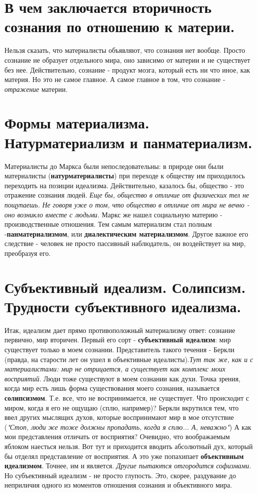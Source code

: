 \documentclass[12pt,a4paper]{article}
\begin{document}
\section{В чем заключается вторичность сознания по отношению к материи.}
Нельзя сказать, что материалисты объявляют, что сознания нет вообще. Просто сознание не образует отдельного мира, оно зависимо от материи и не существует без нее. Действительно, сознание - продукт мозга, который есть ни что иное, как материя. Но это не самое главное. А самое главное в том, что сознание - \textsl{отражение} материи.

\section{Формы материализма. Натурматериализм и панматериализм.}
Материалисты до Маркса были непоследовательны: в природе они были материалисты (\textbf{натурматериалисты}) при переходе к обществу им приходилось переходить на позиции идеализма. Действительно, казалось бы, общество - это отражение сознания людей. 
\textit{Еще бы, общество в отличие от физических тел не пощупаешь.}
\textit{Не говоря уже о том, что общество в отличие от мира не вечно - оно возникло вместе с людьми.} Маркс же нашел социальную материю - производственные отношения. Тем самым материализм стал полным -\textbf{панматериализмом}, или \textbf{диалектическим материализмом}. Другое важное его следствие - человек не просто пассивный наблюдатель, он воздействует на мир, преобразуя его.

\section{Субъективный идеализм. Солипсизм. Трудности субъективного идеализма.}
Итак, идеализм дает прямо противоположный материализму ответ: сознание первично, мир вторичен.  Первый его сорт - \textbf{субъективный идеализм}: мир существует только в моем сознании. Представитель такого течения - Беркли (правда, на старости лет он ушел в объективные идеалисты).\textit{Тут так же, как и с материалистами: мир не отрицается, а существует как комплекс моих восприятий}. Люди тоже существуют в моем сознании как духи.
Точка зрения, когда мир есть лишь форма существования моего сознания, называется \textbf{солипсизмом}. Т.е. все, что не воспринимается, не существует. Что происходит с миром, когда я его не ощущаю (сплю, например)? Беркли вкрутился тем, что ввел других мыслящих духов, которые воспринимают мир в мое отсутствие (\textit{"Стоп, люди же тоже должны пропадать, когда я сплю... А, неважно"}) А как мои представления отличать от восприятия? Очевидно, что воображаемым яблоком наесться нельзя. Вот тут и приходится вводить абсолютный дух, который бы отделял представление от восприятия. А это уже попахипает \textbf{объективным идеализмом}. Точнее, им и является. \textit{Другие пытаются отгородится софизмами.} Но субъективный идеализм - не просто глупость. Это, скорее, раздувание до неприличия одного из моментов отношения сознания и объективного мира.
\end{document}
